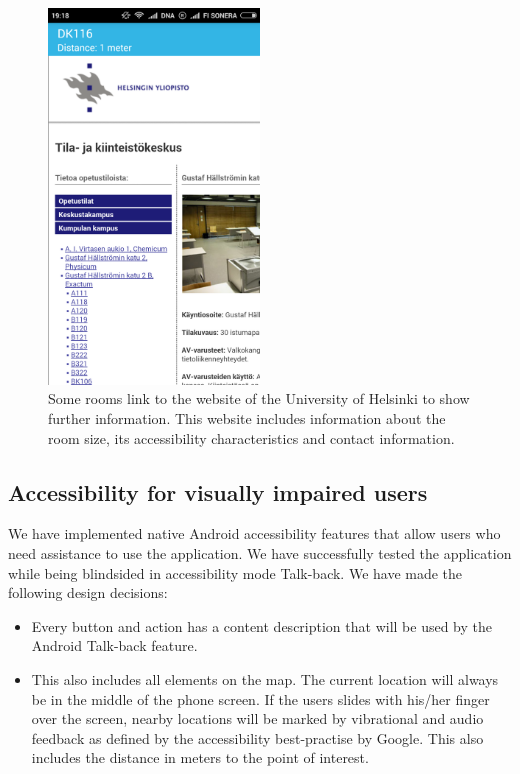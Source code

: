 \documentclass{article}
\begin{document}
\begin{figure}
    \centering
    \includegraphics[width=0.5\textwidth]{Website}
    \caption{Some rooms link to the website of the University of Helsinki to show further information. This website includes information about the room size, its accessibility characteristics and contact information.}
    \label{fig:roominfo2}
\end{figure}

\subsection{Accessibility for visually impaired users} 

We have implemented native Android accessibility features that allow users who need assistance to use the application. We have successfully tested the application while being blindsided in accessibility mode Talk-back. We have made the following design decisions:

\begin{itemize}
    \item Every button and action has a content description that will be used by the Android Talk-back feature.
    \item This also includes all elements on the map. The current location will always be in the middle of the phone screen. If the users slides with his/her finger over the screen, nearby locations will be marked by vibrational and audio feedback as defined by the accessibility best-practise by Google. This also includes the distance in meters to the point of interest.
\end{itemize}
\end{document}
